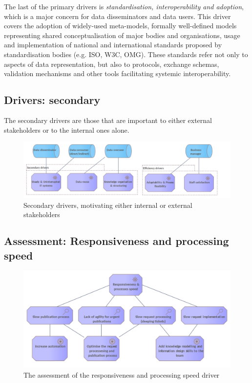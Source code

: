 	The last of the primary drivers is \textit{standardisation, interoperability and adoption}, which is a major concern for data disseminators and data users. This driver covers the adoption of widely-used meta-models, formally well-defined models representing shared conceptualisation of major bodies and organisations, usage and implementation of national and international standards proposed by standardisation bodies (e.g. ISO, W3C, OMG). These standards refer not only to aspects of data representation, but also to protocols, exchange schemas, validation mechanisms and other tools facilitating systemic interoperability. 
	
	\subsection{Drivers: secondary}
	The secondary drivers are those that are important to either external stakeholders or to the internal ones alone.
	
	\begin{figure}[h!]
		\centering
		\includegraphics[width=1.05\textwidth]{images/motivation/Secondary drivers.png}
		\caption{Secondary drivers, motivating either internal or external stakeholders}
		\label{fig:secondary drivers}
	\end{figure}

	
	\subsection{Assessment: Responsiveness and processing speed}
	
	\begin{figure}[h]
		\centering
		\includegraphics[width=\textwidth]{images/motivation/Responsiveless & Process Speed.png}
		\caption{The assessment of the responsiveness and processing speed driver}
		\label{fig:responsiveness-and-processing-speed}
	\end{figure}

